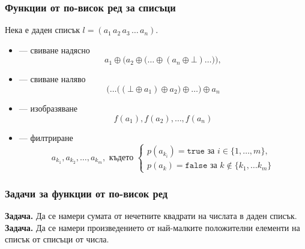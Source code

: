 \documentclass[alsotrans]{beamerswitch}
\begin{document}
\begin{frame}
  \frametitle{Функции от по-висок ред за списъци}

  Нека е даден списък $l = (a_1\,a_2\,a_3\,\ldots\,a_n)$.\\
  \begin{itemize}[<+->]
  \item {} --- свиване надясно
    \begin{equation*}
      a_1 \oplus \Big(a_2 \oplus \big(\ldots \oplus (a_n \oplus \bot) \ldots\big)\Big),
    \end{equation*}
  \item {} --- свиване наляво
    \begin{equation*}
      \Big(\ldots\big((\bot \oplus a_1) \oplus a_2\big) \oplus \ldots\Big) \oplus a_n
    \end{equation*}
  \item {} --- изобразяване
    \begin{equation*}
      f(a_1), f(a_2), \ldots, f(a_n)
    \end{equation*}
  \item {} --- филтриране
    \begin{equation*}
      a_{k_1}, a_{k_2}, \ldots, a_{k_m},\text{ където }\left\{
      \begin{array}{l}
        p(a_{k_i})=\mathtt{true}\text{ за }i\in\{1,\ldots,m\},\\
        p(a_k)=\mathtt{false}\text{ за }k\notin\{k_1,\ldots k_m\}
      \end{array}\right.
    \end{equation*}
  \end{itemize}
\end{frame}

\begin{frame}
  \frametitle{Задачи за функции от по-висок ред}

  \textbf{Задача.} Да се намери сумата от нечетните квадрати на числата в даден списък.\\[6ex]
  \pause
  \textbf{Задача.} Да се намери произведението от най-малките положителни елементи на списък от списъци от числа.
\end{frame}
\end{document}
